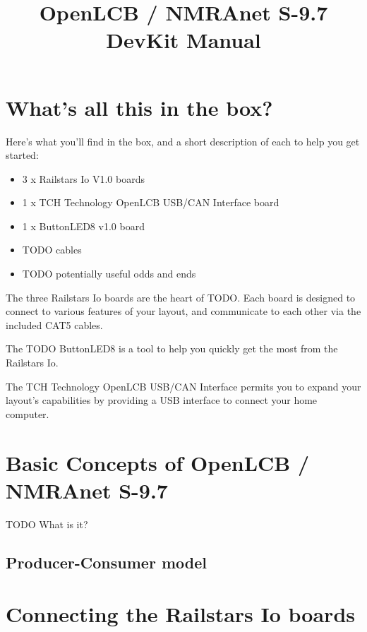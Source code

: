 \documentclass[12pt]{book}
\title{OpenLCB / NMRAnet S-9.7 DevKit Manual}
\begin{document}
\maketitle

\tableofcontents

\chapter{What's all this in the box?}

Here's what you'll find in the box, and a short description of each to help you get started:
\begin{itemize}
\item 3 x Railstars Io V1.0 boards
\item 1 x TCH Technology OpenLCB USB/CAN Interface board
\item 1 x ButtonLED8 v1.0 board
\item TODO cables
\item TODO potentially useful odds and ends
\end{itemize}

The three Railstars Io boards are the heart of TODO. Each board is designed to connect to various features of your layout, and communicate to each other via the included CAT5 cables.

The TODO ButtonLED8 is a tool to help you quickly get the most from the Railstars Io.

The TCH Technology OpenLCB USB/CAN Interface permits you to expand your layout's capabilities by providing a USB interface to connect your home computer.

\chapter{Basic Concepts of OpenLCB / NMRAnet S-9.7}

TODO What is it?

\section{Producer-Consumer model}

\chapter{Connecting the Railstars Io boards}
\end{document}
